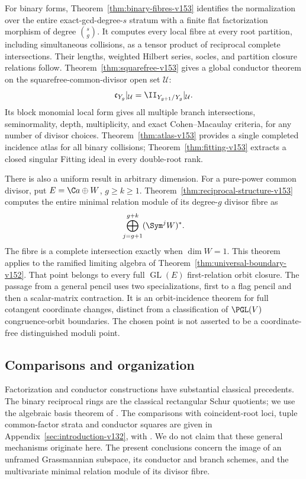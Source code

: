 For binary forms, Theorem~\ref{thm:binary-fibres-v153} identifies the
normalization over the entire exact-gcd-degree-$s$ stratum with a finite
flat factorization morphism of degree $\binom{s}{g}$. It computes every
local fibre at every root partition, including simultaneous collisions,
as a tensor product of reciprocal complete intersections. Their lengths,
weighted Hilbert series, socles, and partition closure relations follow.
Theorem~\ref{thm:squarefree-v153} gives a global conductor theorem on
the squarefree-common-divisor open set $\mathcal U$:
\[
           \mathfrak c_{Y_g}|_{\mathcal U}
                       =\II_{Y_{g+1}/Y_g}|_{\mathcal U}.
\]
Its block monomial local form gives all multiple branch intersections,
seminormality, depth, multiplicity, and exact Cohen--Macaulay criteria,
for any number of divisor choices. Theorem~\ref{thm:atlas-v153}
provides a single completed incidence atlas for all binary collisions;
Theorem~\ref{thm:fitting-v153} extracts a closed singular Fitting ideal
in every double-root rank.

There is also a uniform result in arbitrary dimension. For a pure-power
common divisor, put $E=\C a\oplus W$, $g\geq k\geq1$. Theorem~\ref{thm:reciprocal-structure-v153}
computes the entire minimal relation module of its degree-$g$ divisor
fibre as
\[
             \bigoplus_{j=g+1}^{g+k}(\Sym^jW)^*.
\]
The fibre is a complete intersection exactly when $\dim W=1$.
This theorem applies to the ramified limiting algebra of
Theorem~\ref{thm:universal-boundary-v152}. That point belongs to every
full $\operatorname{GL}(E)$ first-relation orbit closure. The passage
from a general pencil uses two specializations, first to a flag pencil
and then a scalar-matrix contraction. It is an orbit-incidence theorem
for full cotangent coordinate changes, distinct from a classification
of $\PGL(V)$ congruence-orbit boundaries. The chosen point is not
asserted to be a coordinate-free distinguished moduli point.

\subsection{Comparisons and organization}
Factorization and conductor constructions have substantial classical
precedents. The binary reciprocal rings are the classical rectangular
Schur quotients; we use the algebraic basis theorem of
\cite[Theorem~2.7]{Grinberg2019}. The comparisons with coincident-root
loci, tuple common-factor strata and conductor squares are given in
Appendix~\ref{sec:introduction-v132}, with
\cite{Chipalkatti2003,Kurmann2012,HuLinShao2007,Ferrand2003}.
We do not claim that these general mechanisms originate here. The
present conclusions concern the image of an unframed Grassmannian
subspace, its conductor and branch schemes, and the multivariate
minimal relation module of its divisor fibre.

